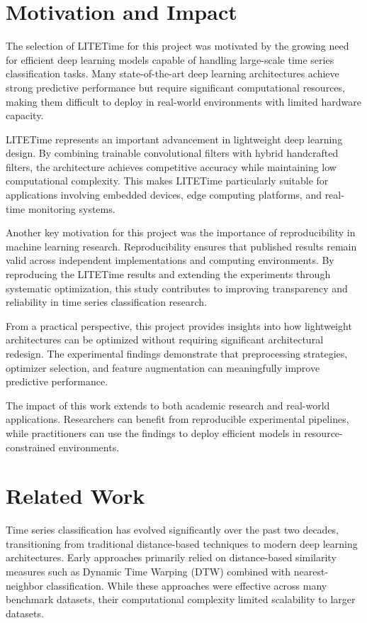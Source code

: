 \documentclass[conference]{IEEEtran}
\begin{document}
\section{Motivation and Impact}

The selection of LITETime for this project was motivated by the growing need for efficient deep learning models capable of handling large-scale time series classification tasks. Many state-of-the-art deep learning architectures achieve strong predictive performance but require significant computational resources, making them difficult to deploy in real-world environments with limited hardware capacity.

LITETime represents an important advancement in lightweight deep learning design. By combining trainable convolutional filters with hybrid handcrafted filters, the architecture achieves competitive accuracy while maintaining low computational complexity. This makes LITETime particularly suitable for applications involving embedded devices, edge computing platforms, and real-time monitoring systems.

Another key motivation for this project was the importance of reproducibility in machine learning research. Reproducibility ensures that published results remain valid across independent implementations and computing environments. By reproducing the LITETime results and extending the experiments through systematic optimization, this study contributes to improving transparency and reliability in time series classification research.

From a practical perspective, this project provides insights into how lightweight architectures can be optimized without requiring significant architectural redesign. The experimental findings demonstrate that preprocessing strategies, optimizer selection, and feature augmentation can meaningfully improve predictive performance.

The impact of this work extends to both academic research and real-world applications. Researchers can benefit from reproducible experimental pipelines, while practitioners can use the findings to deploy efficient models in resource-constrained environments.


\section{Related Work}

Time series classification has evolved significantly over the past two decades, transitioning from traditional distance-based techniques to modern deep learning architectures. Early approaches primarily relied on distance-based similarity measures such as Dynamic Time Warping (DTW) combined with nearest-neighbor classification. While these approaches were effective across many benchmark datasets, their computational complexity limited scalability to larger datasets.
\end{document}
